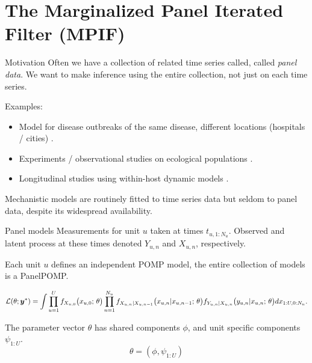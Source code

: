 \documentclass[aspectratio=169]{beamer}\usepackage[]{graphicx}\usepackage[]{xcolor}
\begin{document}
\section{The Marginalized Panel Iterated Filter (MPIF)}

\begin{frame}{Motivation}
Often we have a collection of related time series called, called \emph{panel data}.
We want to make inference using the entire collection, not just on each time series.

Examples:
  \begin{itemize}
    \item Model for disease outbreaks of the same disease, different locations (hospitals / cities) \citep{lee20}.
    \item Experiments / observational studies on ecological populations \citep{searle16}.
    \item Longitudinal studies using within-host dynamic models \citep{ranjeva17}.
  \end{itemize}
  
  Mechanistic models are routinely fitted to time series data but seldom to panel data, despite its widespread availability.
  
\end{frame}

\begin{frame}{Panel models}
  Measurements for unit $u$ taken at times $t_{u, 1:N_u}$. Observed and latent process at these times denoted $Y_{u, n}$ and $X_{u, n}$, respectively.
  
  Each unit $u$ defines an independent POMP model, the entire collection of models is a PanelPOMP.
  
  $$
  \mathcal{L}(\theta; \bm{y}^*) = \int \prod_{u = 1}^U f_{X_{u, 0}}\big(x_{u, 0};\, \theta\big)\prod_{n = 1}^{N_u} f_{X_{u, n}|X_{u, n-1}}\big(x_{u, n}|x_{u, n-1}; \, \theta\big)f_{Y_{u, n}|X_{u, n}}\big(y_{u, n}|x_{u, n}; \, \theta\big) dx_{1:U,0:N_u}.
  $$
  
  The parameter vector $\theta$ has shared components $\phi$, and unit specific components $\psi_{1:U}$.
  $$\theta = (\phi, \psi_{1:U})$$
  
\end{frame}
\end{document}
